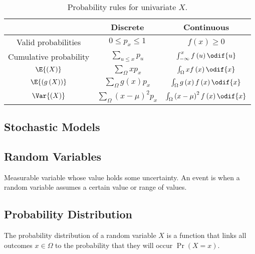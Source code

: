 \documentclass{article}
\begin{document}
\begin{minipage}{126.1962963mm}
    \begin{table}[H]
        \centering
        \begin{tabular}{c c c }
            \toprule
                                                     & \textbf{Discrete}                              & \textbf{Continuous}                                                 \\
            \midrule
            Valid probabilities                      & \(0 \leq p_x \leq 1\)                          & \(f\left( x \right) \geq 0\)                                        \\
            Cumulative probability                   & \(\sum_{u \leq x} p_u\)                        & \(\int_{-\infty}^{x} f\left( u \right) \odif{u}\)                   \\
            \(\E{\left( X \right)}\)                 & \(\sum_{\Omega} xp_x\)                         & \(\int_{\Omega} xf\left( x \right)\odif{x}\)                        \\
            \(\E{\left( g\left( X \right) \right)}\) & \(\sum_{\Omega} g\left( x \right)p_x\)         & \(\int_{\Omega} g\left( x \right)f\left( x \right)\odif{x}\)        \\
            \(\Var{\left( X \right)}\)               & \(\sum_{\Omega} \left( x - \mu \right)^2 p_x\) & \(\int_{\Omega} \left( x - \mu \right)^2f\left( x \right)\odif{x}\) \\
            \bottomrule
        \end{tabular}
        \caption{Probability rules for univariate \(X\).} %
    \end{table}
    \begin{multicols}{2}
        \section{Stochastic Models}
        \subsection{Random Variables}
        Measurable variable whose value holds some uncertainty. An
        event is when a random variable assumes a certain value or
        range of values.
        \subsection{Probability Distribution}
        The probability distribution of a random variable \(X\) is a
        function that links all outcomes \(x \in \Omega\) to the
        probability that they will occur \(\Pr{\left( X = x \right)}\).

\end{multicols}
\end{minipage}
\end{document}
